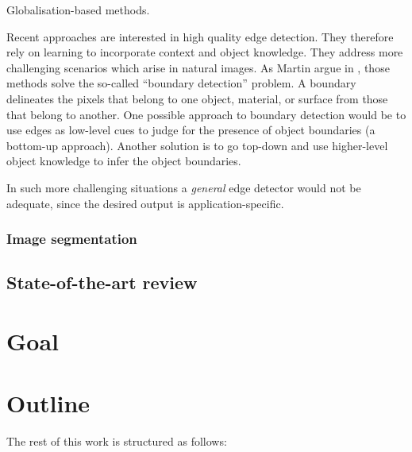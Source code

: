 Globalisation-based methods.

Recent approaches are interested in high quality edge detection. They therefore rely on learning to incorporate context and object knowledge. They address more challenging scenarios which arise in natural images. As Martin \etal argue in \cite{martin2004learning}, those methods solve the so-called ``boundary detection'' problem. A boundary delineates the pixels that belong to one object, material, or surface from those that belong to another. One possible approach to boundary detection would be to use edges as low-level cues to judge for the presence of object boundaries (a bottom-up approach). Another solution is to go top-down and use higher-level object knowledge to infer the object boundaries.

In such more challenging situations a \textit{general} edge detector would not be adequate, since the desired output is application-specific.


\subsubsection{Image segmentation}
\subsection{State-of-the-art review}
\section{Goal}
\section{Outline}
The rest of this work is structured as follows:

